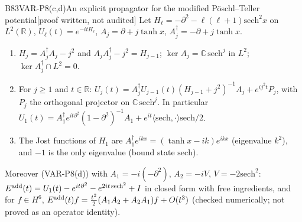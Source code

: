 \documentclass[11pt,a4paper,oneside]{report}
\newcommand{\badge}[2]{\textcolor{#1}{\textsf{\footnotesize[#2]}}}
\newcommand{\pw}{\badge{cD}{proof written, not audited}}
\newcommand{\R}{\mathbb{R}}\newcommand{\C}{\mathbb{C}}\newcommand{\N}{\mathbb{N}}\newcommand{\Z}{\mathbb{Z}}\newcommand{\Q}{\mathbb{Q}}
\newenvironment{dimcard}[5]{\par\Needspace{12\baselineskip}\begin{dimcardbox}{#1}{#2}{#3}{#4}{#5}}{\end{dimcardbox}}
\begin{document}
\begin{dimcard}{B83}{VAR-P8(c,d)}{An explicit propagator for the modified P\"oschl--Teller potential}{\pw}{}
Let $H_\ell=-\partial^2-\ell(\ell+1)\mathrm{sech}^2x$ on $L^2(\R)$, $U_\ell(t)=e^{-itH_\ell}$, $A_j=\partial+j\tanh x$, $A_j^\dagger=-\partial+j\tanh x$.
\begin{enumerate}[label=(\roman*)]
\item $H_j=A_j^\dagger A_j-j^2$ and $A_jA_j^\dagger-j^2=H_{j-1}$; $\ker A_j=\C\,\mathrm{sech}^j$ in $L^2$; $\ker A_j^\dagger\cap L^2=0$.
\item For $j\ge1$ and $t\in\R$: $U_j(t)=A_j^\dagger U_{j-1}(t)(H_{j-1}+j^2)^{-1}A_j+e^{ij^2t}P_j$, with $P_j$ the orthogonal projector on $\C\,\mathrm{sech}^j$. In particular $U_1(t)=A_1^\dagger e^{it\partial^2}(1-\partial^2)^{-1}A_1+e^{it}\langle\mathrm{sech},\cdot\rangle\mathrm{sech}/2$.
\item The Jost functions of $H_1$ are $A_1^\dagger e^{ikx}=(\tanh x-ik)e^{ikx}$ (eigenvalue $k^2$), and $-1$ is the only eigenvalue (bound state $\mathrm{sech}$).
\end{enumerate}
Moreover (VAR-P8(d)) with $A_1=-i(-\partial^2)$, $A_2=-iV$, $V=-2\mathrm{sech}^2$: $E^{\rm add}(t)=U_1(t)-e^{it\partial^2}-e^{2it\,\mathrm{sech}^2}+I$ in closed form with free ingredients, and for $f\in H^6$, $E^{\rm add}(t)f=\frac{t^2}2(A_1A_2+A_2A_1)f+O(t^3)$ (checked numerically; not proved as an operator identity).
\end{dimcard}
\end{document}
